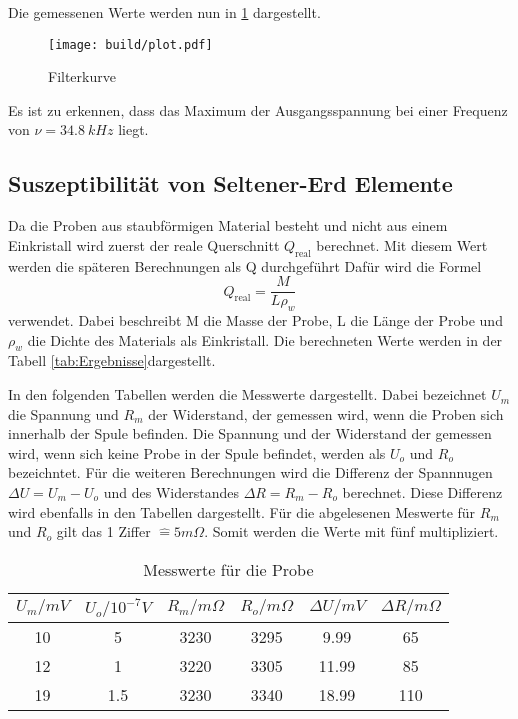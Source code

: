 \noindent Die gemessenen Werte werden nun in \ref{fig:filter} dargestellt.

\begin{figure}[H]
    \centering
    \texttt{[image: build/plot.pdf]}
    \caption{Filterkurve}
    \label{fig:filter}
\end{figure} 

\noindent Es ist zu erkennen, dass das Maximum der Ausgangsspannung bei einer Frequenz von $\nu = \qty{34.8}{kHz}$ liegt.

\subsection{Suszeptibilität von Seltener-Erd Elemente}

Da die Proben aus staubförmigen Material besteht und nicht aus einem Einkristall wird zuerst der reale Querschnitt $Q_\text{real}$ berechnet.
Mit diesem Wert werden die späteren Berechnungen als Q durchgeführt
Dafür wird die Formel 
\begin{equation}
    Q_\text{real} = \frac{M}{L \rho_w}
\end{equation}
verwendet.
Dabei beschreibt M die Masse der Probe, L die Länge der Probe und $\rho_w$ die Dichte des Materials als Einkristall.
Die berechneten Werte werden in der Tabell \ref{tab:Ergebnisse}dargestellt.

\noindent In den folgenden Tabellen werden die Messwerte dargestellt. Dabei bezeichnet $U_m$ die Spannung und $R_m$ der Widerstand, der gemessen wird, wenn die Proben sich
innerhalb der Spule befinden. 
Die Spannung und der Widerstand der gemessen wird, wenn sich keine Probe in der Spule befindet, werden als $U_o$ und $R_o$ bezeichntet.
Für die weiteren Berechnungen wird die Differenz der Spannnugen $\Delta U = U_m -U_o$ und des Widerstandes $\Delta R = R_m - R_o$ berechnet.
Diese Differenz wird ebenfalls in den Tabellen dargestellt.
Für die abgelesenen Meswerte für $R_m$ und $R_o$ gilt das 1 Ziffer $\widehat{=} 5 m \Omega$. 
Somit werden die Werte mit fünf multipliziert.

\begin{table}[H]
    \centering
    \caption{Messwerte für die Probe }
    \label{tab:Nd}
    \begin{tabular}{c c c c c c}
        \toprule
        $U_m / mV$ & $U_o / 10^{-7}V$ & $R_m /m\Omega$ & $R_o /m\Omega$ & $\Delta U /mV$ & $\Delta R /m\Omega$ \\
        \midrule        
        10  & 5    & 3230  & 3295  & 9.99  &   65   \\ 
        12  & 1    & 3220  & 3305  & 11.99  &  85    \\ 
        19  & 1.5  & 3230  & 3340  & 18.99  &  110    \\ 
        \bottomrule
    \end{tabular}
\end{table}

